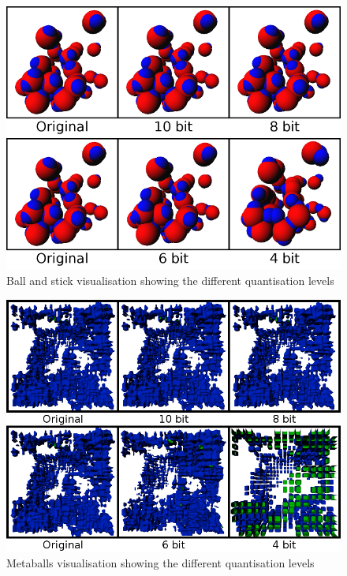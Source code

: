 \begin{figure}[h!]
  \begin{center}
    \includegraphics[width=120mm]{ballstick4680}
  \end{center}
  \caption{Ball and stick visualisation showing the different quantisation
  levels}
  \label{fig:experiment_ballstick4680}
\end{figure}

\begin{figure}[h!]
  \begin{center}
    \includegraphics[width=120mm]{metaballs4680}
  \end{center}
  \caption{Metaballs visualisation showing the different quantisation
  levels}
  \label{fig:experiment_metaballs4680}
\end{figure}

